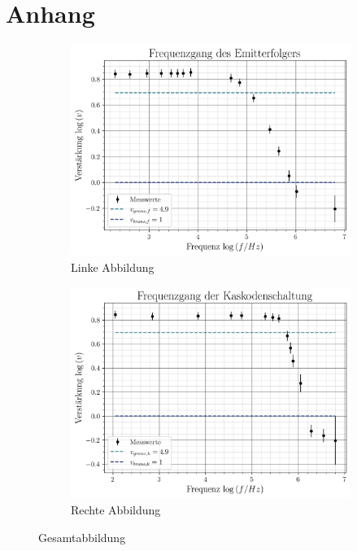 \section{Anhang}

   

    \begin{figure}[H]
        \centering
        \begin{subfigure}{0.4\textwidth}
            \includegraphics[width=\linewidth]{figs/V4_2e_emitter.jpg}
            \caption{Linke Abbildung}
        \end{subfigure}
        \hspace{1cm}
        \begin{subfigure}{0.4\textwidth}
            \includegraphics[width=\linewidth]{figs/V4_2e_kaskode.jpg}
            \caption{Rechte Abbildung}
            \label{fig:frequ_kaskode}
        \end{subfigure}
        \caption{Gesamtabbildung}
    \end{figure}

